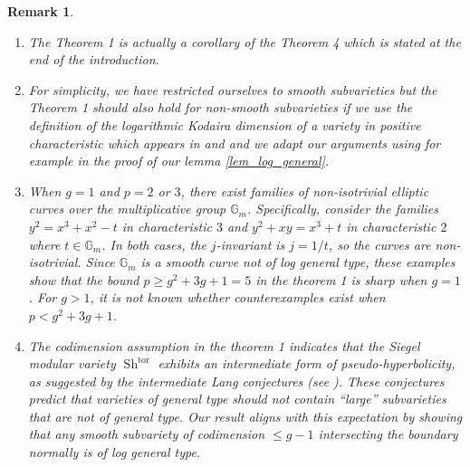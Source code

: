 \documentclass[11pt]{amsart}
\numberwithin{subsection}{section}
\numberwithin{figure}{section}
\numberwithin{table}{section}
\theoremstyle{1}
\theoremstyle{2}
\newtheorem*{rmrk*}{Remark}
\DeclareMathOperator{\Sh}{Sh}
\DeclareMathOperator{\tor}{tor}
\begin{document}
\begin{rmrk*}
\
\begin{enumerate}
\item The Theorem 1 is actually a corollary of the Theorem 4 which is stated at the end of the introduction.
\item For simplicity, we have restricted ourselves to smooth subvarieties but the Theorem 1 should also hold for non-smooth subvarieties if we use the definition of the logarithmic Kodaira dimension of a variety in positive characteristic which appears in \cite[p.46]{abramovich1994subvarieties} and \cite{luo1987kodaira, luo1988invariant} and we adapt our arguments using for example \cite[Lemma 5, p.46]{abramovich1994subvarieties} in the proof of our lemma \ref{lem_log_general}.
\item When $g = 1$ and $p = 2$ or $3$, there exist families of non-isotrivial elliptic curves over the multiplicative group $\mathbb{G}_m$. Specifically, consider the families $y^2 = x^3+x^2 - t$ in characteristic $3$ and $y^2 + xy = x^3 +t$ in characteristic $2$ where $t \in \mathbb{G}_m$. In both cases, the $j$-invariant is $j = 1/t$, so the curves are non-isotrivial. Since $\mathbb{G}_m$ is a smooth curve not of log general type, these examples show that the bound $p \geq g^2 + 3g + 1 = 5$ in the theorem 1 is sharp when $g = 1$. For $g > 1$, it is not known whether counterexamples exist when $p < g^2 + 3g + 1$.
\item The codimension assumption in the theorem 1 indicates that the Siegel modular variety $\Sh^{\tor}$ exhibits an intermediate form of pseudo-hyperbolicity, as suggested by the intermediate Lang conjectures (see \cite{MR828820}). These conjectures predict that varieties of general type should not contain ``large'' subvarieties that are not of general type. Our result aligns with this expectation by showing that any smooth subvariety of codimension $\leq g - 1$ intersecting the boundary normally is of log general type.
\end{enumerate}
\end{rmrk*}
\end{document}
